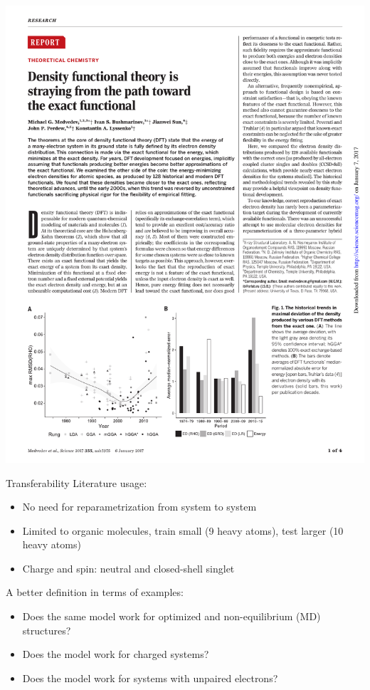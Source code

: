 \documentclass[xetex,compress]{beamer}
\begin{document}
\begin{frame}{}
  \begin{center}
    \includegraphics[width=1.00\textwidth]{./figures/obit2.pdf}
  \end{center}
\end{frame}

\begin{frame}{Transferability}
  Literature usage:
  \begin{itemize}
  \item No need for reparametrization from system to system
  \item Limited to organic molecules, train small (9 heavy atoms), test larger (10 heavy atoms)
  \item Charge and spin: neutral and closed-shell singlet
  \end{itemize}
  A better definition in terms of examples:
  \begin{itemize}
  \item Does the same model work for optimized and non-equilibrium (MD) structures?
  \item Does the model work for charged systems?
  \item Does the model work for systems with unpaired electrons?
  \end{itemize}
\end{frame}
\end{document}
